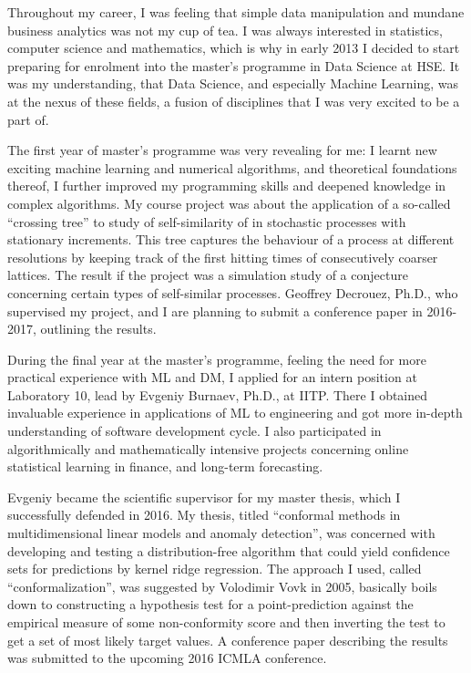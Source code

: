 \documentclass[14pt]{letter}
\begin{document}
Throughout my career, I was feeling that simple data manipulation and mundane business analytics was not my cup of tea. I was always interested in statistics, computer science and mathematics, which is why in early 2013 I decided to start preparing for enrolment into the master's programme in Data Science at HSE. It was my understanding, that Data Science, and especially Machine Learning, was at the nexus of these fields, a fusion of disciplines that I was very excited to be a part of. \par\medskip

The first year of master's programme was very revealing for me: I learnt new exciting machine learning and numerical algorithms, and theoretical foundations thereof, I further improved my programming skills and deepened knowledge in complex algorithms. My course project was about the application of a so-called ``crossing tree'' to study of self-similarity of in stochastic processes with stationary increments. This tree captures the behaviour of a process at different resolutions by keeping track of the first hitting times of consecutively coarser lattices. The result if the project was a simulation study of a conjecture concerning certain types of self-similar processes. Geoffrey Decrouez, Ph.D., who supervised my project, and I are planning to submit a conference paper in 2016-2017, outlining the results. \par\medskip

During the final year at the master's programme, feeling the need for more practical experience with ML and DM, I applied for an intern position at Laboratory 10, lead by Evgeniy Burnaev, Ph.D., at IITP. There I obtained invaluable experience in applications of ML to engineering and got more in-depth understanding of software development cycle. I also participated in algorithmically and mathematically intensive projects concerning online statistical learning in finance, and long-term forecasting. \par\medskip

Evgeniy became the scientific supervisor for my master thesis, which I successfully defended in 2016. My thesis, titled ``conformal methods in multidimensional linear models and anomaly detection'', was concerned with developing and testing a distribution-free algorithm that could yield confidence sets for predictions by kernel ridge regression. The approach I used, called ``conformalization'', was suggested by Volodimir Vovk in 2005, basically boils down to constructing a hypothesis test for a point-prediction against the empirical measure of some non-conformity score and then inverting the test to get a set of most likely target values. A conference paper describing the results was submitted to the upcoming 2016 ICMLA conference. \par\medskip
\end{document}
